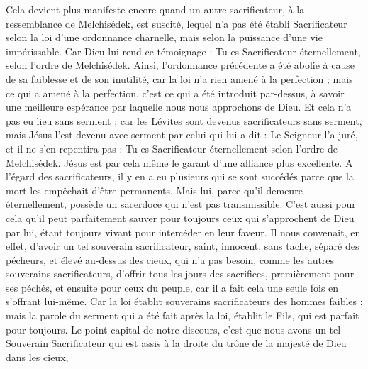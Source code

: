 \begin{multicols}{2}
Cela devient plus manifeste encore quand un autre sacrificateur, à la ressemblance de Melchisédek, est suscité,
lequel n'a pas été établi Sacrificateur selon la loi d’une ordonnance charnelle, mais selon la puissance d’une vie impérissable.
Car Dieu lui rend ce témoignage : Tu es Sacrificateur éternellement, selon l'ordre de Melchisédek.
Ainsi, l’ordonnance précédente a été abolie à cause de sa faiblesse et de son inutilité,
car la loi n’a rien amené à la perfection ; mais ce qui a amené à la perfection, c’est ce qui a été introduit par-dessus, à savoir une meilleure espérance par laquelle nous nous approchons de Dieu.
Et cela n’a pas eu lieu sans serment ;
car les Lévites sont devenus sacrificateurs sans serment, mais Jésus l’est devenu avec serment par celui qui lui a dit : Le Seigneur l'a juré, et il ne s'en repentira pas : Tu es Sacrificateur éternellement selon l'ordre de Melchisédek.
Jésus est par cela même le garant d’une alliance plus excellente.
A l’égard des sacrificateurs, il y en a eu plusieurs qui se sont succédés parce que la mort les empêchait d’être permanents.
Mais lui, parce qu'il demeure éternellement, possède un sacerdoce qui n’est pas transmissible.
C'est aussi pour cela qu’il peut parfaitement sauver pour toujours ceux qui s'approchent de Dieu par lui, étant toujours vivant pour intercéder en leur faveur.
Il nous convenait, en effet, d'avoir un tel souverain sacrificateur, saint, innocent, sans tache, séparé des pécheurs, et élevé au-dessus des cieux,
qui n’a pas besoin, comme les autres souverains sacrificateurs, d'offrir tous les jours des sacrifices, premièrement pour ses péchés, et ensuite pour ceux du peuple, car il a fait cela une seule fois en s’offrant lui-même.
Car la loi établit souverains sacrificateurs des hommes faibles ; mais la parole du serment qui a été fait après la loi, établit le Fils, qui est parfait pour toujours.
\VerseOne{}Le point capital de notre discours, c'est que nous avons un tel Souverain Sacrificateur qui est assis à la droite du trône de la majesté de Dieu dans les cieux,

\end{multicols}
